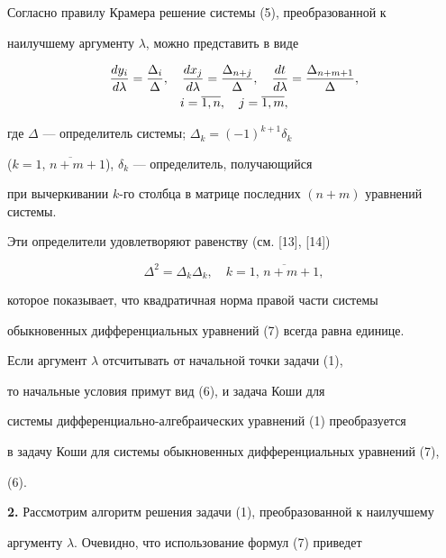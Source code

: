 \begin{note}


Согласно правилу Крамера решение системы (5), преобразованной к


наилучшему аргументу $\lambda$, можно представить в виде


\begin{gather}


\derhd{y_i}{\lambda}=\frac{\Delta_i}{\Delta},\quad


\derhd{x_j}{\lambda}=\frac{\Delta_{n+j}}{\Delta},\quad


\derhd{t}{\lambda}=\frac{\Delta_{n+m+1}}{\Delta},\\


i=\overline{1, n},\quad j=\overline{1, m},\notag


\end{gather}


где $\Delta$ --- определитель системы; $\Delta_k=(-1)^{k+1}\delta_k$


($k=\overline{1,\,n+m+1}$), $\delta_k$ --- определитель, получающийся


при вычеркивании $k$-го столбца в матрице последних $(n+m)$ уравнений системы.


Эти определители удовлетворяют равенству (см. [13], [14])


$$


\Delta^2=\Delta_k\Delta_k,\quad k=\overline{1,\, n+m+1},


$$


которое  показывает, что квадратичная норма правой части системы


обыкновенных дифференциальных уравнений (7) всегда равна единице.


Если аргумент $\lambda$ отсчитывать  от начальной точки задачи (1),


то начальные условия примут вид (6), и задача Коши для


системы дифференциально-алгебраических уравнений (1) преобразуется


в задачу Коши для системы обыкновенных дифференциальных уравнений (7),


(6).


\end{note}





{\bf 2.} Рассмотрим алгоритм решения задачи (1), преобразованной к наилучшему


аргументу $\lambda$. Очевидно, что использование формул (7) приведет


